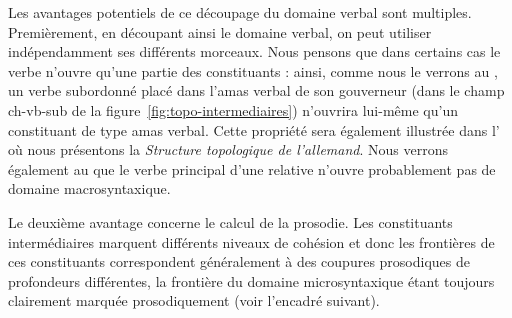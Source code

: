 Les avantages potentiels de ce découpage du domaine verbal sont multiples. Premièrement, en découpant ainsi le domaine verbal, on peut utiliser indépendamment ses différents morceaux. Nous pensons que dans certains cas le verbe n’ouvre qu’une partie des constituants : ainsi, comme nous le verrons au , un verbe subordonné placé dans l’amas verbal de son gouverneur (dans le champ ch-vb-sub de la figure~\ref{fig:topo-intermediaires}) n’ouvrira lui-même qu’un constituant de type amas verbal. Cette propriété sera également illustrée dans l’ où nous présentons la \textit{Structure topologique de l’allemand}. Nous verrons également au  que le verbe principal d’une relative n’ouvre probablement pas de domaine macrosyntaxique.

Le deuxième avantage concerne le calcul de la prosodie. Les constituants intermédiaires marquent différents niveaux de cohésion et donc les frontières de ces constituants correspondent généralement à des coupures prosodiques de profondeurs différentes, la frontière du domaine microsyntaxique étant toujours clairement marquée prosodiquement (voir l'encadré suivant).\largerpage[2]

